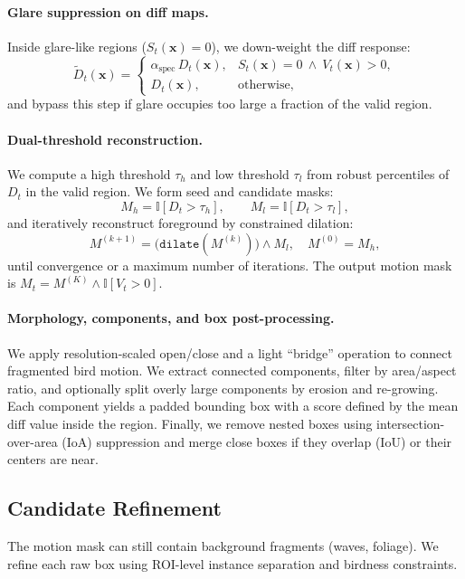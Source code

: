 \paragraph{Glare suppression on diff maps.}
Inside glare-like regions ($S_t(\mathbf{x})=0$), we down-weight the diff response:
\begin{equation}
\widetilde{D}_t(\mathbf{x})=
\begin{cases}
\alpha_{\text{spec}}\,D_t(\mathbf{x}), & S_t(\mathbf{x})=0\ \wedge\ V_t(\mathbf{x})>0,\\
D_t(\mathbf{x}), & \text{otherwise},
\end{cases}
\end{equation}
and bypass this step if glare occupies too large a fraction of the valid region.

\paragraph{Dual-threshold reconstruction.}
We compute a high threshold $\tau_h$ and low threshold $\tau_l$ from robust percentiles of $D_t$ in the valid region.
We form seed and candidate masks:
\begin{equation}
M_h=\mathbb{I}[D_t>\tau_h],\qquad M_l=\mathbb{I}[D_t>\tau_l],
\end{equation}
and iteratively reconstruct foreground by constrained dilation:
\begin{equation}
M^{(k+1)}=\big(\texttt{dilate}(M^{(k)})\big)\wedge M_l,\quad M^{(0)}=M_h,
\end{equation}
until convergence or a maximum number of iterations. The output motion mask is $M_t=M^{(K)}\wedge \mathbb{I}[V_t>0]$.

\paragraph{Morphology, components, and box post-processing.}
We apply resolution-scaled open/close and a light ``bridge'' operation to connect fragmented bird motion.
We extract connected components, filter by area/aspect ratio, and optionally split overly large components by erosion and re-growing.
Each component yields a padded bounding box with a score defined by the mean diff value inside the region.
Finally, we remove nested boxes using intersection-over-area (IoA) suppression and merge close boxes if they overlap (IoU) or their centers are near.

\subsection{Candidate Refinement}
The motion mask can still contain background fragments (waves, foliage). We refine each raw box using ROI-level instance separation and birdness constraints.


